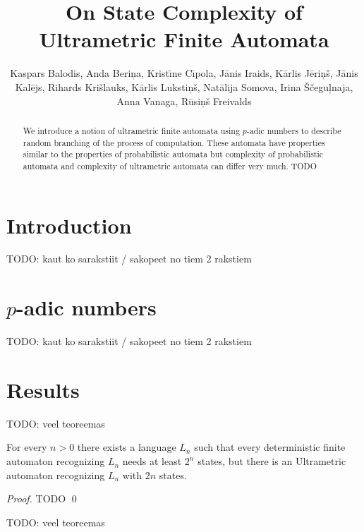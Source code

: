 \documentclass{llncs}
\begin{document}
\title{On State Complexity of Ultrametric Finite Automata}


\author{
Kaspars Balodis,
Anda Beri\c na,
Krist\= \i ne C\= \i pola,
J\= anis Iraids,
K\= arlis J\= eri\c n\v s,
J\= anis Kal\= ejs,
Rihards Kri\v slauks,
K\= arlis Luksti\c n\v s,
Nat\= alija Somova,
Irina \v S\v cegu\c lnaja,
Anna Vanaga,
R\= usi\c n\v s Freivalds}



\maketitle

\begin{abstract}  
We introduce a notion of ultrametric finite automata using $p$-adic numbers to describe random branching of the process of computation. These automata have properties similar to the properties of probabilistic automata but complexity of probabilistic automata and complexity of ultrametric automata can differ very much.
TODO
\end{abstract} 



\section{Introduction} 
TODO: kaut ko sarakstiit / sakopeet no tiem 2 rakstiem 

\section{$p$-adic numbers}
TODO: kaut ko sarakstiit / sakopeet no tiem 2 rakstiem 

\section{Results}

TODO: veel teoreemas

\begin{theorem}
For every $n>0$ there exists a language $L_n$ such that every deterministic finite automaton recognizing $L_n$ needs at least $2^n$ states, but there is an Ultrametric automaton recognizing $L_n$ with $2 n$ states.
\end{theorem}
\begin{proof}
TODO
\qed
\end{proof}

TODO: veel teoreemas
\end{document}
